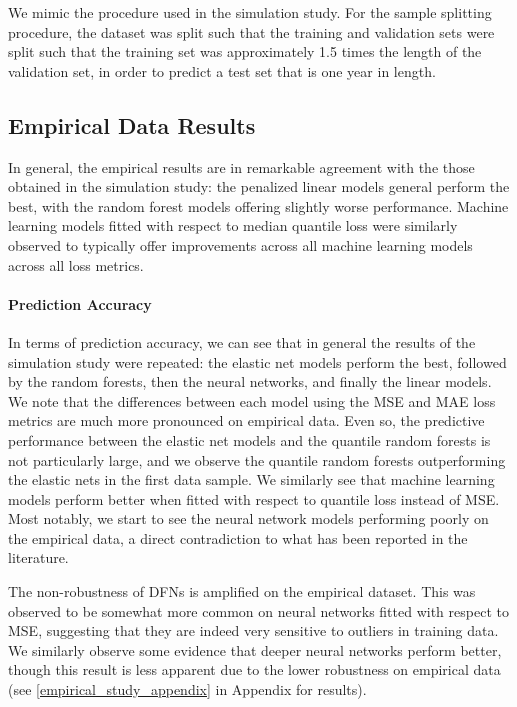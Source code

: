 \documentclass{article}
\begin{document}
We mimic the procedure used in the simulation study. For the sample splitting procedure, the dataset was split such that the training and validation sets were split such that the training set was approximately 1.5 times the length of the validation set, in order to predict a test set that is one year in length.

\subsection{Empirical Data Results}


In general, the empirical results are in remarkable agreement with the those obtained in the simulation study: the penalized linear models general perform the best, with the random forest models offering slightly worse performance. Machine learning models fitted with respect to median quantile loss were similarly observed to typically offer improvements across all machine learning models across all loss metrics. 

\paragraph{Prediction Accuracy}

In terms of prediction accuracy, we can see that in general the results of the simulation study were repeated: the elastic net models perform the best, followed by the random forests, then the neural networks, and finally the linear models. We note that the differences between each model using the MSE and MAE loss metrics are much more pronounced on empirical data. Even so, the predictive performance between the elastic net models and the quantile random forests is not particularly large, and we observe the quantile random forests outperforming the elastic nets in the first data sample. We similarly see that machine learning models perform better when fitted with respect to quantile loss instead of MSE. Most notably, we start to see the neural network models performing poorly on the empirical data, a direct contradiction to what has been reported in the literature.



The non-robustness of DFNs is amplified on the empirical dataset. This was observed to be somewhat more common on neural networks fitted with respect to MSE, suggesting that they are indeed very sensitive to outliers in training data. We similarly observe some evidence that deeper neural networks perform better, though this result is less apparent due to the lower robustness on empirical data (see \ref{empirical_study_appendix} in Appendix for results).
\end{document}
